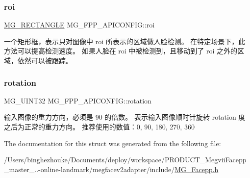 \subsubsection{\texorpdfstring{roi}{roi}}
{\footnotesize\ttfamily \hyperlink{struct_m_g___r_e_c_t_a_n_g_l_e}{M\+G\+\_\+\+R\+E\+C\+T\+A\+N\+G\+LE} M\+G\+\_\+\+F\+P\+P\+\_\+\+A\+P\+I\+C\+O\+N\+F\+I\+G\+::roi}

一个矩形框，表示只对图像中 roi 所表示的区域做人脸检测。 在特定场景下，此方法可以提高检测速度。 如果人脸在 roi 中被检测到，且移动到了 roi 之外的区域，依然可以被跟踪。 \mbox{\label{struct_m_g___f_p_p___a_p_i_c_o_n_f_i_g_ad0896de3b631a7d8cf84fbfc8015d533}} 
\subsubsection{\texorpdfstring{rotation}{rotation}}
{\footnotesize\ttfamily M\+G\+\_\+\+U\+I\+N\+T32 M\+G\+\_\+\+F\+P\+P\+\_\+\+A\+P\+I\+C\+O\+N\+F\+I\+G\+::rotation}

输入图像的重力方向，必须是 90 的倍数。 表示输入图像顺时针旋转 rotation 度之后为正常的重力方向。 推荐使用的数值：0, 90, 180, 270, 360 

The documentation for this struct was generated from the following file\+:\begin{DoxyCompactItemize}
\item 
/\+Users/binghezhouke/\+Documents/deploy/workspace/\+P\+R\+O\+D\+U\+C\+T\+\_\+\+Megvii\+Facepp\+\_\+master\+\_..-\/online-\/landmark/megfacev2adapter/include/\hyperlink{_m_g___facepp_8h}{M\+G\+\_\+\+Facepp.\+h}\end{DoxyCompactItemize}

